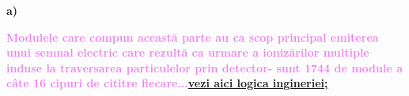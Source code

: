 \documentclass{beamer}
\begin{document}
\begin{frame}{\textbf{a)}}

\vspace{2.5cm}
\small
\makebox[1cm]{} \textbf{\textcolor{violet}{Modulele care compun această parte au ca scop principal emiterea unui semnal electric care rezultă ca urmare a ionizărilor multiple induse la traversarea particulelor prin detector- sunt 1744 de module a câte 16 cipuri de cititre fiecare...\href{https://www.youtube.com/watch?v=LGAly8wfhC4}{\textbf{vezi aici logica ingineriei;}}} }
 
\end{frame}


\end{document}
